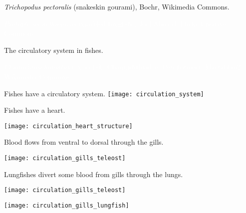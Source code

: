 \documentclass[t,handout]{beamer}  %
\begin{document}
{
\begin{frame}[b,plain]
\hfill\tiny\textit{Trichopodus pectoralis} (snakeskin gourami), Bochr, Wikimedia Commons.
\end{frame}
}

{
\begin{frame}[b,plain]
\tiny\textcolor{white}{\textit{Protopterus aethiopicus} (marbled lungfish), Joel Abroad, Flickr Creative Commons.}
\end{frame}
}


{
	\begin{frame}[b,plain]{The circulatory system in fishes.}
	
	\hfill\parbox{3.2cm}{\raggedright\tiny\textcolor{white}{\textit{Chionodraco hamatus} (an icefish, Channichthyidae: Perciformes), Marrabbio2, Wikimedia Commons.}}
	
\end{frame}
}


\begin{frame}[c,plain]{Fishes have a  circulatory system.}
\centering
\texttt{[image: circulation\_system]}

\end{frame}

\begin{frame}[c,plain]{Fishes have a  heart.}

\texttt{[image: circulation\_heart\_structure]}

\end{frame}

\begin{frame}[c,plain]{Blood flows from ventral to dorsal through the gills.}

\texttt{[image: circulation\_gills\_teleost]}


\end{frame}

\begin{frame}[c,plain]{Lungfishes divert some blood from gills through the lungs.}

\texttt{[image: circulation\_gills\_teleost]}

\texttt{[image: circulation\_gills\_lungfish]}

\end{frame}
\end{document}
